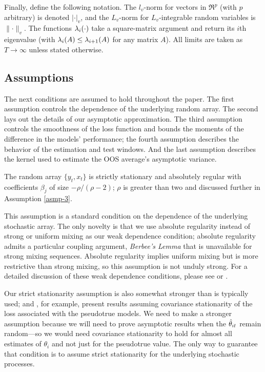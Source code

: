 \documentclass[12pt,draft]{article}
\begin{document}
Finally, define the following notation.  The $l_v$-norm for vectors in
$\Re^p$ (with $p$ arbitrary) is denoted $\lvert \cdot \rvert_v$, and
the $L_v$-norm for $L_v$-integrable random variables is $\lVert \cdot
\rVert_v$.  The functions $\operatorname{\lambda}_i(\cdot)$ take a square-matrix
argument and return its $i$th eigenvalue (with $\operatorname{\lambda}_{i}(A) \leq
\operatorname{\lambda}_{i+1}(A)$ for any matrix $A$).  All limits are taken as $T \to
\infty$ unless stated otherwise.

\subsection{Assumptions}
\label{sec:asmp}

The next conditions are assumed to hold throughout the paper.  The first
assumption controls the dependence of the underlying random array.
The second lays out the details of our asymptotic approximation.
The third assumption controls the
smoothness of the loss function and bounds the moments of the
difference in the models' performance; the fourth assumption describes
the behavior of the estimation and test windows.  And the last
assumption describes the kernel used to estimate the OOS average's
asymptotic variance.

\begin{asmp}\label{asmp-1}
  The random array $\{y_t,x_t\}$ is strictly stationary and absolutely regular
  with coefficients $\beta_j$ of size $-\rho/(\rho-2)$; $\rho$ is
  greater than two and discussed further in Assumption \ref{asmp-3}.
\end{asmp}

This assumption is a standard condition on the dependence of the
underlying stochastic array. The only novelty is that we use
absolute regularity instead of strong or uniform mixing as our
weak dependence condition; absolute regularity admits a particular
coupling argument, \emph{Berbee's Lemma} \citep[reproduced in this
paper as Lemma A.1 for reference]{Ber:79} that is
unavailable for strong mixing sequences. Absolute regularity
implies uniform mixing but is more restrictive than strong mixing,
so this assumption is not unduly strong.
For a detailed discussion of these weak dependence conditions,
please see \citet{Dav:94} or \citet{Dou:94}.

Our strict stationarity assumption is also somewhat stronger than is
typically used; \citet{Wes:96} and \citet{Mcc:07}, for example,
present results assuming covariance stationarity of the loss
associated with the pseudotrue models. We need to make a stronger
assumption because we will need to prove asymptotic results when the
$\hat\theta_{it}$ remain random---so we would need covariance stationarity to
hold for almost all estimates of $\theta_i$ and not just for the
pseudotrue value. The only way to guarantee that condition is to
assume strict stationarity for the underlying stochastic processes.
\end{document}
